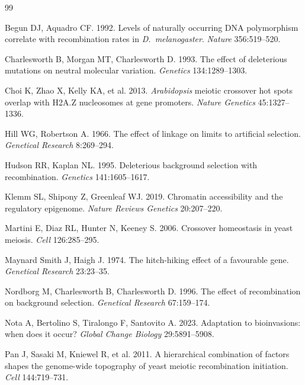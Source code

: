\documentclass[11pt]{article}
\theoremstyle{remark}
\begin{document}

\begin{thebibliography}{99}
\small

Begun DJ, Aquadro CF. 1992. Levels of naturally occurring DNA polymorphism
correlate with recombination rates in \emph{D.\ melanogaster}.
\emph{Nature} 356:519--520.

Charlesworth B, Morgan MT, Charlesworth D. 1993. The effect of deleterious
mutations on neutral molecular variation. \emph{Genetics} 134:1289--1303.

Choi K, Zhao X, Kelly KA, et al. 2013. \emph{Arabidopsis} meiotic crossover hot
spots overlap with H2A.Z nucleosomes at gene promoters.
\emph{Nature Genetics} 45:1327--1336.

Hill WG, Robertson A. 1966. The effect of linkage on limits to artificial
selection. \emph{Genetical Research} 8:269--294.

Hudson RR, Kaplan NL. 1995. Deleterious background selection with recombination.
\emph{Genetics} 141:1605--1617.

Klemm SL, Shipony Z, Greenleaf WJ. 2019. Chromatin accessibility and the
regulatory epigenome. \emph{Nature Reviews Genetics} 20:207--220.

Martini E, Diaz RL, Hunter N, Keeney S. 2006. Crossover homeostasis in yeast
meiosis. \emph{Cell} 126:285--295.

Maynard Smith J, Haigh J. 1974. The hitch-hiking effect of a favourable gene.
\emph{Genetical Research} 23:23--35.

Nordborg M, Charlesworth B, Charlesworth D. 1996. The effect of recombination on
background selection. \emph{Genetical Research} 67:159--174.

Nota A, Bertolino S, Tiralongo F, Santovito A. 2023. Adaptation to bioinvasions:
when does it occur? \emph{Global Change Biology} 29:5891--5908.

Pan J, Sasaki M, Kniewel R, et al. 2011. A hierarchical combination of factors
shapes the genome-wide topography of yeast meiotic recombination initiation.
\emph{Cell} 144:719--731.


\end{thebibliography}
\end{document}
